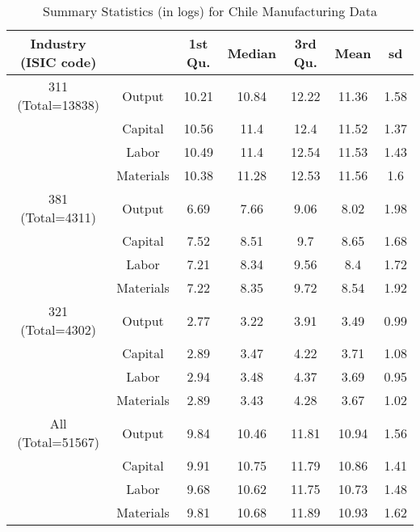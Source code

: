 \begin{table}[H]
\centering
\caption{Summary Statistics (in logs) for Chile Manufacturing Data} 
\begin{tabular}{ccccccc}
  \hline\hline Industry (ISIC code) &   & 1st Qu. & Median & 3rd Qu. & Mean & sd \\ 
  \hline
311 (Total=13838) & Output & 10.21 & 10.84 & 12.22 & 11.36 & 1.58 \\ 
   & Capital & 10.56 & 11.4 & 12.4 & 11.52 & 1.37 \\ 
   & Labor & 10.49 & 11.4 & 12.54 & 11.53 & 1.43 \\ 
   & Materials & 10.38 & 11.28 & 12.53 & 11.56 & 1.6 \\ 
  381 (Total=4311) & Output & 6.69 & 7.66 & 9.06 & 8.02 & 1.98 \\ 
   & Capital & 7.52 & 8.51 & 9.7 & 8.65 & 1.68 \\ 
   & Labor & 7.21 & 8.34 & 9.56 & 8.4 & 1.72 \\ 
   & Materials & 7.22 & 8.35 & 9.72 & 8.54 & 1.92 \\ 
  321 (Total=4302) & Output & 2.77 & 3.22 & 3.91 & 3.49 & 0.99 \\ 
   & Capital & 2.89 & 3.47 & 4.22 & 3.71 & 1.08 \\ 
   & Labor & 2.94 & 3.48 & 4.37 & 3.69 & 0.95 \\ 
   & Materials & 2.89 & 3.43 & 4.28 & 3.67 & 1.02 \\ 
  All (Total=51567) & Output & 9.84 & 10.46 & 11.81 & 10.94 & 1.56 \\ 
   & Capital & 9.91 & 10.75 & 11.79 & 10.86 & 1.41 \\ 
   & Labor & 9.68 & 10.62 & 11.75 & 10.73 & 1.48 \\ 
   & Materials & 9.81 & 10.68 & 11.89 & 10.93 & 1.62 \\ 
   \hline
\end{tabular}
\end{table}
